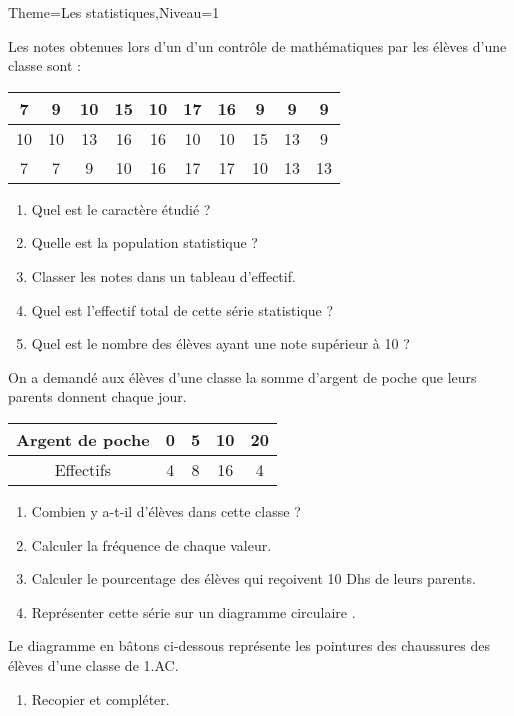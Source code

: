\documentclass[a4paper,12pt]{article}
\begin{document}
\begin{Maquette}[Fiche]{Theme=Les statistiques,Niveau=1}

\begin{exercice}
Les notes obtenues lors d'un d'un contrôle de mathématiques par les élèves d'une classe sont :

\begin{tabular}{|c|c|c|c|c|c|c|c|c|c|}
7 & 9 & 10 & 15 & 10 & 17 & 16 & 9 & 9 & 9 \\ 
\hline 
10 & 10 & 13 & 16 & 16 & 10 & 10 & 15 & 13 & 9 \\ 
\hline 
7 & 7 & 9 & 10 & 16 & 17 & 17 & 10 & 13 & 13 \\ 
\end{tabular} 
\begin{enumerate}
\item Quel est le caractère étudié ?
\item Quelle est la population statistique ?
\item Classer les notes dans un tableau d'effectif.
\item Quel est l'effectif total de cette série statistique ?
\item Quel est le nombre des élèves ayant une note supérieur à 10 ?
\end{enumerate}
\end{exercice}

\begin{exercice}
On a demandé aux élèves d'une classe la somme d'argent de poche que leurs parents donnent chaque jour.

\begin{tabular}{|c|c|c|c|c|}
 \hline 
 Argent de poche & 0 & 5 & 10 & 20 \\ 
 \hline 
 Effectifs & 4 & 8 & 16 & 4 \\ 
 \hline 
 \end{tabular} 
 \begin{enumerate}
 \item Combien y a-t-il d'élèves dans cette classe ?
 \item Calculer la fréquence de chaque valeur.
 \item Calculer le pourcentage des élèves qui reçoivent 10 Dhs de leurs parents.
 \item Représenter cette série sur un diagramme circulaire .
 \end{enumerate}
\end{exercice}

\begin{exercice}
Le diagramme en bâtons ci-dessous représente les pointures des chaussures des élèves d'une classe de 1.AC.\newline
\begin{minipage}{.55\linewidth}
\begin{enumerate}
\item Recopier et compléter.


\end{enumerate}
\end{minipage}
\end{exercice}
\end{Maquette}
\end{document}
